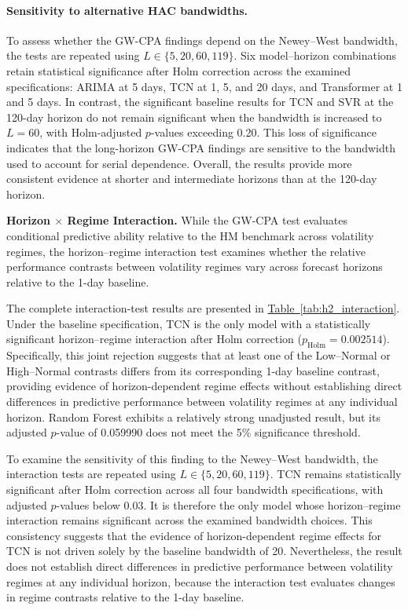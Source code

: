 \documentclass[runningheads,orivec]{llncs}
\begin{document}
\paragraph{Sensitivity to alternative HAC bandwidths.} To assess whether the GW-CPA findings depend on the Newey--West bandwidth, the tests are repeated using $L \in \{5,20,60,119\}$. Six model--horizon combinations retain statistical significance after Holm correction across the examined specifications: ARIMA at 5 days, TCN at 1, 5, and 20 days, and Transformer at 1 and 5 days. In contrast, the significant baseline results for TCN and SVR at the 120-day horizon do not remain significant when the bandwidth is increased to $L=60$, with Holm-adjusted $p$-values exceeding 0.20. This loss of significance indicates that the long-horizon GW-CPA findings are sensitive to the bandwidth used to account for serial dependence. Overall, the results provide more consistent evidence at shorter and intermediate horizons than at the 120-day horizon.

\noindent\textbf{Horizon $\times$ Regime Interaction.}
While the GW-CPA test evaluates conditional predictive ability relative to the HM benchmark across volatility regimes, the horizon--regime interaction test examines whether the relative performance contrasts between volatility regimes vary across forecast horizons relative to the 1-day baseline.

The complete interaction-test results are presented in \hyperref[tab:h2_interaction]{Table~\ref*{tab:h2_interaction}}. Under the baseline specification, TCN is the only model with a statistically significant horizon--regime interaction after Holm correction ($p_{\mathrm{Holm}}=0.002514$). Specifically, this joint rejection suggests that at least one of the Low--Normal or High--Normal contrasts differs from its corresponding 1-day baseline contrast, providing evidence of horizon-dependent regime effects without establishing direct differences in predictive performance between volatility regimes at any individual horizon. Random Forest exhibits a relatively strong unadjusted result, but its adjusted $p$-value of 0.059990 does not meet the 5\% significance threshold.

To examine the sensitivity of this finding to the Newey--West bandwidth, the interaction tests are repeated using $L \in \{5,20,60,119\}$. TCN remains statistically significant after Holm correction across all four bandwidth specifications, with adjusted $p$-values below 0.03. It is therefore the only model whose horizon--regime interaction remains significant across the examined bandwidth choices. This consistency suggests that the evidence of horizon-dependent regime effects for TCN is not driven solely by the baseline bandwidth of 20. Nevertheless, the result does not establish direct differences in predictive performance between volatility regimes at any individual horizon, because the interaction test evaluates changes in regime contrasts relative to the 1-day baseline.
\end{document}
